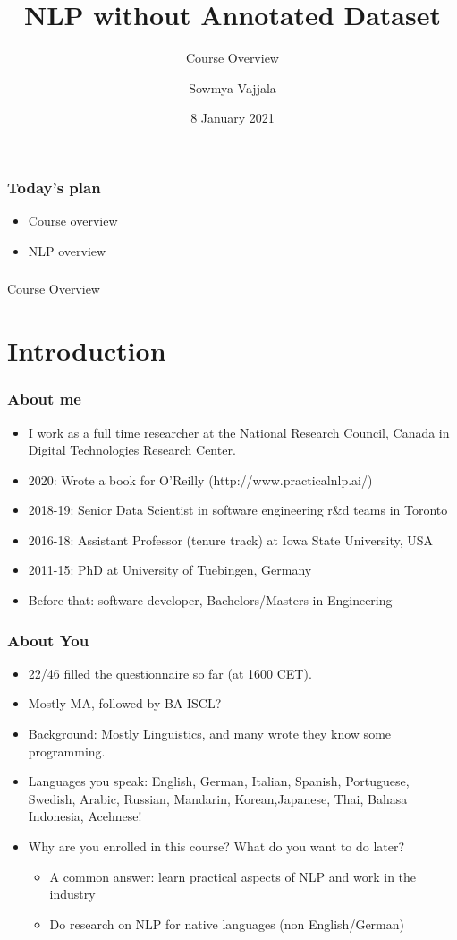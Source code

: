 \documentclass{beamer}
\author[Sowmya Vajjala]{Sowmya Vajjala}
\title[SfSNLP]{NLP without Annotated Dataset}
\subtitle{Course Overview}
\date{8 January 2021}
\institute{Seminar f\"ur Sprachwissenschaft, University of T\"ubingen, Germany}
\begin{document}
\begin{frame}\titlepage
\end{frame}

\begin{frame}
\frametitle{Today's plan}
\begin{itemize}
    \item Course overview
    \item NLP overview
\end{itemize}
\end{frame}


\begin{frame}
\frametitle{}
\bigskip
\Large Course Overview
\end{frame}

\section{Introduction}
\begin{frame}
\frametitle{About me}
\begin{itemize}
\item I work as a full time researcher at the National Research Council, Canada in Digital Technologies Research Center.
\item 2020: Wrote a book for O'Reilly (http://www.practicalnlp.ai/)
\item 2018-19: Senior Data Scientist in software engineering r\&d teams in Toronto
\item 2016-18: Assistant Professor (tenure track) at Iowa State University, USA
\item 2011-15: PhD at University of Tuebingen, Germany
\item Before that: software developer, Bachelors/Masters in Engineering
\end{itemize}
\end{frame}

\begin{frame}
\frametitle{About You}
\begin{itemize}
\item 22/46 filled the questionnaire so far (at 1600 CET).
\item Mostly MA, followed by BA ISCL?
\item Background: Mostly Linguistics, and many wrote they know some programming. 
\item Languages you speak: English, German, Italian, Spanish, Portuguese, Swedish, Arabic, Russian, Mandarin, Korean,Japanese, Thai, Bahasa Indonesia, Acehnese! \pause
\item Why are you enrolled in this course? What do you want to do later?
\begin{itemize}
\item A common answer: learn practical aspects of NLP and work in the industry
\item Do research on NLP for native languages (non English/German)
\end{itemize}
\end{itemize}
\end{frame}
\end{document}
